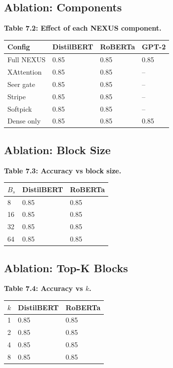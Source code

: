 \subsection{Ablation: Components}

\textbf{Table 7.2: Effect of each NEXUS component.}

\begin{table}[H]
\centering
\small
\begin{tabular}{llll}
\toprule
\textbf{Config} & \textbf{DistilBERT} & \textbf{RoBERTa} & \textbf{GPT-2} \\
\midrule
Full NEXUS & 0.85 & 0.85 & 0.85 \\
XAttention & 0.85 & 0.85 & -- \\
Seer gate & 0.85 & 0.85 & -- \\
Stripe & 0.85 & 0.85 & -- \\
Softpick & 0.85 & 0.85 & -- \\
Dense only & 0.85 & 0.85 & 0.85 \\
\bottomrule
\end{tabular}
\end{table}

\subsection{Ablation: Block Size}

\textbf{Table 7.3: Accuracy vs block size.}

\begin{table}[H]
\centering
\small
\begin{tabular}{lll}
\toprule
\textbf{$B_s$} & \textbf{DistilBERT} & \textbf{RoBERTa} \\
\midrule
8 & 0.85 & 0.85 \\
16 & 0.85 & 0.85 \\
32 & 0.85 & 0.85 \\
64 & 0.85 & 0.85 \\
\bottomrule
\end{tabular}
\end{table}

\subsection{Ablation: Top-K Blocks}

\textbf{Table 7.4: Accuracy vs $k$.}

\begin{table}[H]
\centering
\small
\begin{tabular}{lll}
\toprule
\textbf{$k$} & \textbf{DistilBERT} & \textbf{RoBERTa} \\
\midrule
1 & 0.85 & 0.85 \\
2 & 0.85 & 0.85 \\
4 & 0.85 & 0.85 \\
8 & 0.85 & 0.85 \\
\bottomrule
\end{tabular}
\end{table}


